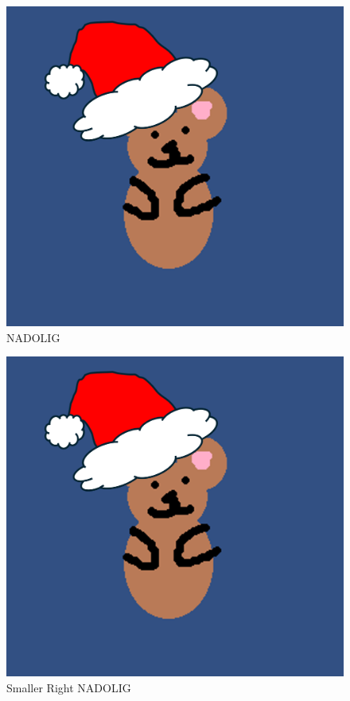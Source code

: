 \documentclass[
  letterpaper,
  DIV=11,
  numbers=noendperiod]{scrartcl}
\begin{document}
\begin{figure}[H]

{\centering \includegraphics[width=1\linewidth,height=\textheight,keepaspectratio]{images/dog2.png}

}

\caption{NADOLIG}

\end{figure}%

\begin{figure}

\hfill\includegraphics[width=0.5\linewidth,height=\textheight,keepaspectratio]{images/dog2.png}

\caption{\label{fig-nadolig-small-right}Smaller Right NADOLIG}

\end{figure}%
\end{document}

